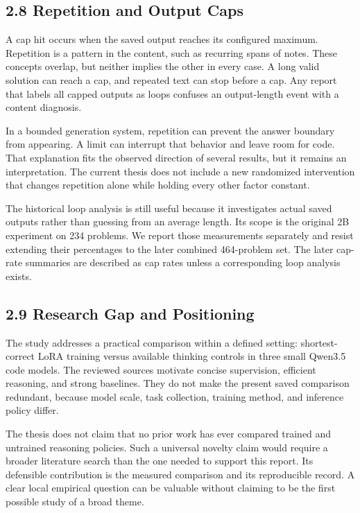 \documentclass[11pt,letterpaper]{article}
\begin{document}
\subsection*{2.8 Repetition and Output Caps}

A cap hit occurs when the saved output reaches its configured maximum. Repetition is a pattern in the content, such as recurring spans of notes. These concepts overlap, but neither implies the other in every case. A long valid solution can reach a cap, and repeated text can stop before a cap. Any report that labels all capped outputs as loops confuses an output-length event with a content diagnosis.\par

In a bounded generation system, repetition can prevent the answer boundary from appearing. A limit can interrupt that behavior and leave room for code. That explanation fits the observed direction of several results, but it remains an interpretation. The current thesis does not include a new randomized intervention that changes repetition alone while holding every other factor constant.\par

The historical loop analysis is still useful because it investigates actual saved outputs rather than guessing from an average length. Its scope is the original 2B experiment on 234 problems. We report those measurements separately and resist extending their percentages to the later combined 464-problem set. The later cap-rate summaries are described as cap rates unless a corresponding loop analysis exists.\par

\subsection*{2.9 Research Gap and Positioning}

The study addresses a practical comparison within a defined setting: shortest-correct LoRA training versus available thinking controls in three small Qwen3.5 code models. The reviewed sources motivate concise supervision, efficient reasoning, and strong baselines. They do not make the present saved comparison redundant, because model scale, task collection, training method, and inference policy differ.\par

The thesis does not claim that no prior work has ever compared trained and untrained reasoning policies. Such a universal novelty claim would require a broader literature search than the one needed to support this report. Its defensible contribution is the measured comparison and its reproducible record. A clear local empirical question can be valuable without claiming to be the first possible study of a broad theme.\par
\end{document}
